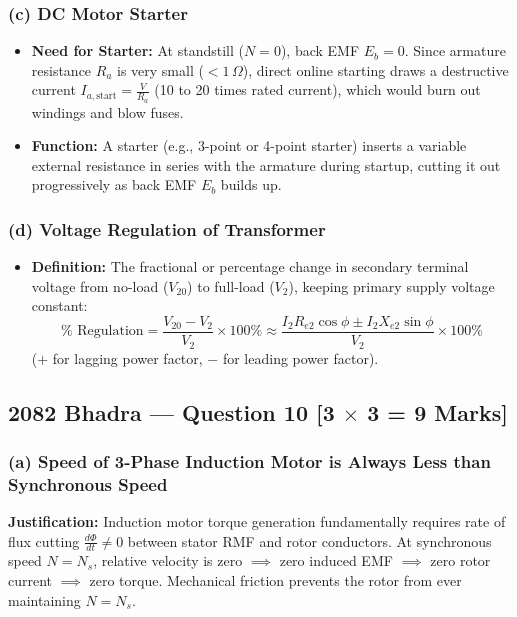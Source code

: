 \documentclass[11pt,a4paper,oneside]{article}
\begin{document}
\subsubsection*{(c) DC Motor Starter}
\begin{itemize}[leftmargin=1.5em]
  \item \textbf{Need for Starter:} At standstill ($N=0$), back EMF $E_b = 0$. Since armature resistance $R_a$ is very small ($< 1\,\Omega$), direct online starting draws a destructive current $I_{a,\text{start}} = \frac{V}{R_a}$ (10 to 20 times rated current), which would burn out windings and blow fuses.
  \item \textbf{Function:} A starter (e.g., 3-point or 4-point starter) inserts a variable external resistance in series with the armature during startup, cutting it out progressively as back EMF $E_b$ builds up.
\end{itemize}

\subsubsection*{(d) Voltage Regulation of Transformer}
\begin{itemize}[leftmargin=1.5em]
  \item \textbf{Definition:} The fractional or percentage change in secondary terminal voltage from no-load ($V_{20}$) to full-load ($V_2$), keeping primary supply voltage constant:
  \begin{equation}
    \% \text{ Regulation} = \frac{V_{20} - V_2}{V_2} \times 100\% \approx \frac{I_2 R_{e2}\cos\phi \pm I_2 X_{e2}\sin\phi}{V_2} \times 100\%
  \end{equation}
  ($+$ for lagging power factor, $-$ for leading power factor).
\end{itemize}

\newpage

\subsection{2082 Bhadra --- Question 10 [3 $\times$ 3 = 9 Marks]}

\subsubsection*{(a) Speed of 3-Phase Induction Motor is Always Less than Synchronous Speed}
\textbf{Justification:} Induction motor torque generation fundamentally requires rate of flux cutting $\frac{d\Phi}{dt} \ne 0$ between stator RMF and rotor conductors. At synchronous speed $N = N_s$, relative velocity is zero $\implies$ zero induced EMF $\implies$ zero rotor current $\implies$ zero torque. Mechanical friction prevents the rotor from ever maintaining $N = N_s$.
\end{document}
